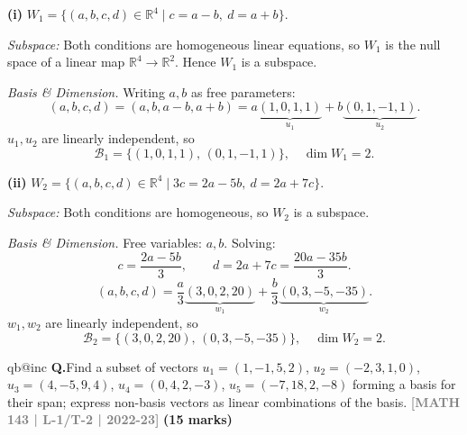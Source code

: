 \documentclass[12pt,a3paper]{article}
\makeatletter
\newcommand{\yr}[1]{\hfill\textcolor{gray}{\small\textbf{[#1]}}}
\newcommand{\mk}[1]{\textcolor{orange!70!black}{\small\textbf{(#1 marks)}}}
\newcounter{qnum}
\newcommand{\Q}[1]{%
  \csname qb@inc\endcsname
  \needspace{4\baselineskip}
  \refstepcounter{qnum}
  \vspace{6pt}
  \noindent\textbf{Q\theqnum.}\enspace #1\par
}
\makeatother
\begin{document}
\begin{tcolorbox}[enhanced,breakable,
  colback=cC!4,colframe=cC,boxrule=0.8pt,arc=5pt,
  title={\textbf{Answer --- Subspaces of $\mathbb{R}^4$}},
  fonttitle=\bfseries\color{white},colbacktitle=cC]

\textbf{(i)} $W_1 = \{(a,b,c,d)\in\mathbb{R}^4 \mid c=a-b,\ d=a+b\}$.

\medskip
\textit{Subspace:} Both conditions are homogeneous linear equations, so $W_1$ is the
null space of a linear map $\mathbb{R}^4\to\mathbb{R}^2$. Hence $W_1$ is a subspace.

\medskip
\textit{Basis \& Dimension.} Writing $a,b$ as free parameters:
\[
  (a,b,c,d)=(a,b,a-b,a+b)
  =a\underbrace{(1,0,1,1)}_{u_1}+b\underbrace{(0,1,-1,1)}_{u_2}.
\]
$u_1,u_2$ are linearly independent, so
\[
  \boxed{\mathcal{B}_1=\{(1,0,1,1),\,(0,1,-1,1)\},\quad \dim W_1=2.}
\]

\medskip
\textbf{(ii)} $W_2=\{(a,b,c,d)\in\mathbb{R}^4\mid 3c=2a-5b,\ d=2a+7c\}$.

\medskip
\textit{Subspace:} Both conditions are homogeneous, so $W_2$ is a subspace.

\medskip
\textit{Basis \& Dimension.} Free variables: $a,b$. Solving:
\[
  c=\frac{2a-5b}{3},\qquad
  d=2a+7c=\frac{20a-35b}{3}.
\]
\[
  (a,b,c,d)=\frac{a}{3}\underbrace{(3,0,2,20)}_{w_1}+\frac{b}{3}\underbrace{(0,3,-5,-35)}_{w_2}.
\]
$w_1,w_2$ are linearly independent, so
\[
  \boxed{\mathcal{B}_2=\{(3,0,2,20),\,(0,3,-5,-35)\},\quad \dim W_2=2.}
\]

\end{tcolorbox}

\Q{Find a subset of vectors $u_1 = (1,-1,5,2)$, $u_2 = (-2,3,1,0)$, $u_3 = (4,-5,9,4)$, $u_4 = (0,4,2,-3)$, $u_5 = (-7,18,2,-8)$ forming a basis for their span; express non-basis vectors as linear combinations of the basis.
\yr{MATH 143 | L-1/T-2 | 2022-23} \mk{15}}
\end{document}
